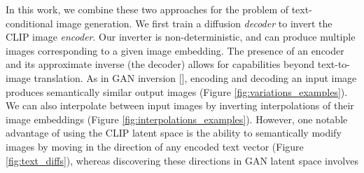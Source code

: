 \documentclass{article}
\newcommand{\shortcite}[1]{[\citenum{#1}]}
\begin{document}
In this work, we combine these two approaches for the problem of text-conditional image generation. We first train a diffusion \textit{decoder} to invert the CLIP image \textit{encoder}. Our inverter is non-deterministic, and can produce multiple images corresponding to a given image embedding. The presence of an encoder and its approximate inverse (the decoder) allows for capabilities beyond text-to-image translation. As in GAN inversion \shortcite{ganinversion,ganinversionsurvey}, encoding and decoding an input image produces semantically similar output images (Figure \ref{fig:variations_examples}). We can also interpolate between input images by inverting interpolations of their image embeddings (Figure \ref{fig:interpolations_examples}). However, one notable advantage of using the CLIP latent space is the ability to semantically modify images by moving in the direction of any encoded text vector (Figure \ref{fig:text_diffs}), whereas discovering these directions in GAN latent space involves
\end{document}
